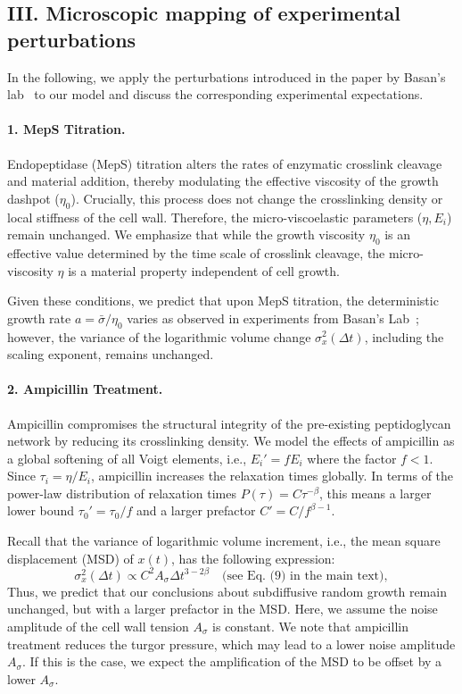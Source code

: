 \documentclass[aps, prl, longbibliography, linenumbers, superscriptaddress]{revtex4-2}
\newcommand{\blue}{\color{blue}}
\newcommand{\blue}{}
\begin{document}
{\blue
\subsection{III. Microscopic mapping of experimental perturbations}

In the following, we apply the perturbations introduced in the paper by Basan's lab~\cite{Mukherjee2025bacterial} to our model and discuss the corresponding experimental expectations.

\paragraph{1. MepS Titration.}
Endopeptidase (MepS) titration alters the rates of enzymatic crosslink cleavage and material addition, thereby modulating the effective viscosity of the growth dashpot ($\eta_0$). Crucially, this process does not change the crosslinking density or local stiffness of the cell wall. Therefore, the micro-viscoelastic parameters ($\eta, E_i$) remain unchanged. We emphasize that while the growth viscosity $\eta_0$ is an effective value determined by the time scale of crosslink cleavage, the micro-viscosity $\eta$ is a material property independent of cell growth.

Given these conditions, we predict that upon MepS titration, the deterministic growth rate $a = \bar{\sigma} / \eta_0$ varies as observed in experiments from Basan's Lab~\cite{Mukherjee2025bacterial}; however, the variance of the logarithmic volume change $\sigma_x^2(\Delta t)$, including the scaling exponent, remains unchanged.

\paragraph{2. Ampicillin Treatment.}
Ampicillin compromises the structural integrity of the pre-existing peptidoglycan network by reducing its crosslinking density. We model the effects of ampicillin as a global softening of all Voigt elements, i.e., $E_i' = f E_i$ where the factor $f < 1$. Since $\tau_i = \eta / E_i$, ampicillin increases the relaxation times globally. In terms of the power-law distribution of relaxation times $P(\tau) = C \tau^{-\beta}$, this means a larger lower bound $\tau_0' = \tau_0 / f$ and a larger prefactor $C' = C / f^{\beta - 1}$.

Recall that the variance of logarithmic volume increment, i.e., the mean square displacement (MSD) of $x(t)$, has the following expression:
\begin{equation}
    \sigma_x^2(\Delta t) \propto C^2 A_\sigma \Delta t^{3 - 2\beta} \quad \text{(see Eq.~(9) in the main text)},
\end{equation}
Thus, we predict that our conclusions about subdiffusive random growth remain unchanged, but with a larger prefactor in the MSD. Here, we assume the noise amplitude of the cell wall tension $A_\sigma$ is constant. We note that ampicillin treatment reduces the turgor pressure, which may lead to a lower noise amplitude $A_\sigma$. If this is the case, we expect the amplification of the MSD to be offset by a lower $A_\sigma$.

}
\end{document}
